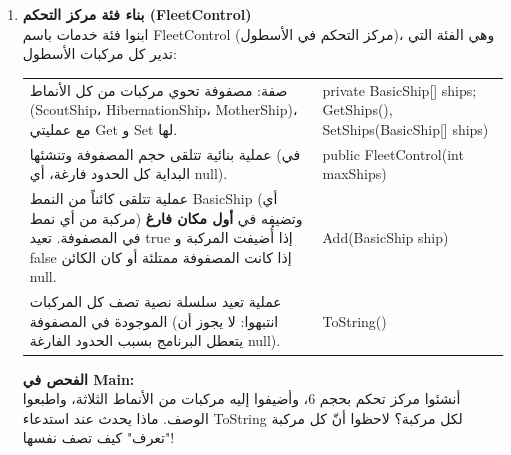 \documentclass[14pt]{extarticle}
\begin{document}
\begin{enumerate}[label=\textbf{تمرين \arabic*:}, wide=0pt, leftmargin=*, itemsep=2.2em]

    \item \textbf{بناء فئة مركز التحكم (\textenglish{FleetControl})} \\
    ابنوا فئة خدمات باسم \textenglish{FleetControl} (مركز التحكم في الأسطول)، وهي الفئة التي تدير كل مركبات الأسطول:

    {\centering
    \renewcommand{\arraystretch}{1.2}
    \small
    \begin{tabular}{|>{\raggedleft\arraybackslash}p{}|>{\raggedright\arraybackslash}p{}|}
    \hline
    \multicolumn{2}{|c|}{\textbf{الفئة: \textenglish{FleetControl}}} \\
    \hline
    صفة: مصفوفة تحوي مركبات من كل الأنماط (\textenglish{ScoutShip}، \textenglish{HibernationShip}، \textenglish{MotherShip})، مع عمليتي \textenglish{Get} و \textenglish{Set} لها. & \textenglish{private BasicShip[] ships;} \newline \textenglish{GetShips(), SetShips(BasicShip[] ships)} \\
    \hline
    عملية بنائية تتلقى حجم المصفوفة وتنشئها (في البداية كل الحدود فارغة، أي \textenglish{null}). & \textenglish{public FleetControl(int maxShips)} \\
    \hline
    عملية تتلقى كائناً من النمط \textenglish{BasicShip} (أي مركبة من أي نمط) وتضيفه في \textbf{أول مكان فارغ} في المصفوفة. تعيد \textenglish{true} إذا أُضيفت المركبة و \textenglish{false} إذا كانت المصفوفة ممتلئة أو كان الكائن \textenglish{null}. & \textenglish{Add(BasicShip ship)} \\
    \hline
    عملية تعيد سلسلة نصية تصف كل المركبات الموجودة في المصفوفة (انتبهوا: لا يجوز أن يتعطل البرنامج بسبب الحدود الفارغة \textenglish{null}). & \textenglish{ToString()} \\
    \hline
    \end{tabular}
    \par} %

    \vspace{2em}
    \noindent \textbf{الفحص في \textenglish{Main}:} \\
    أنشئوا مركز تحكم بحجم 6، وأضيفوا إليه مركبات من الأنماط الثلاثة، واطبعوا الوصف. ماذا يحدث عند استدعاء \textenglish{ToString} لكل مركبة؟ لاحظوا أنّ كل مركبة "تعرف" كيف تصف نفسها!


\end{enumerate}
\end{document}
